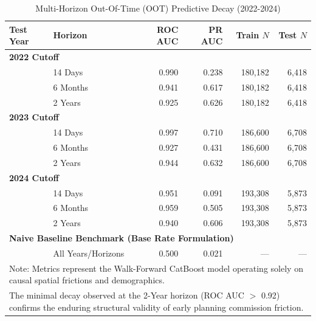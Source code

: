 \begin{table}[H]
\centering
\caption{Multi-Horizon Out-Of-Time (OOT) Predictive Decay (2022-2024)}
\label{tab:multi_horizon_results}
\small
\begin{tabular}{@{}llrrrr@{}}
\toprule
\textbf{Test Year} & \textbf{Horizon} & \textbf{ROC AUC} & \textbf{PR AUC} & \textbf{Train $N$} & \textbf{Test $N$} \\
\midrule
\multicolumn{6}{l}{\textbf{2022 Cutoff}} \\
& 14 Days & 0.990 & 0.238 & 180,182 & 6,418 \\
& 6 Months & 0.941 & 0.617 & 180,182 & 6,418 \\
& 2 Years & 0.925 & 0.626 & 180,182 & 6,418 \\
\midrule
\multicolumn{6}{l}{\textbf{2023 Cutoff}} \\
& 14 Days & 0.997 & 0.710 & 186,600 & 6,708 \\
& 6 Months & 0.927 & 0.431 & 186,600 & 6,708 \\
& 2 Years & 0.944 & 0.632 & 186,600 & 6,708 \\
\midrule
\multicolumn{6}{l}{\textbf{2024 Cutoff}} \\
& 14 Days & 0.951 & 0.091 & 193,308 & 5,873 \\
& 6 Months & 0.959 & 0.505 & 193,308 & 5,873 \\
& 2 Years & 0.940 & 0.606 & 193,308 & 5,873 \\
\midrule
\multicolumn{6}{l}{\textbf{Naive Baseline Benchmark (Base Rate Formulation)}} \\
& All Years/Horizons & 0.500 & 0.021 & --- & --- \\
\bottomrule
\multicolumn{6}{l}{\footnotesize Note: Metrics represent the Walk-Forward CatBoost model operating solely on causal spatial frictions and demographics.} \\
\multicolumn{6}{l}{\footnotesize The minimal decay observed at the 2-Year horizon (ROC AUC $>$ 0.92) confirms the enduring structural validity of early planning commission friction.}
\end{tabular}
\end{table}
